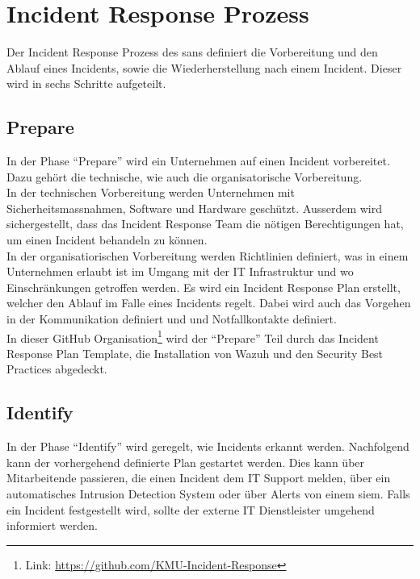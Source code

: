 \section{Incident Response Prozess}
Der Incident Response Prozess des \acrfull{sans} definiert die Vorbereitung und den Ablauf eines Incidents, sowie die Wiederherstellung nach einem Incident.
Dieser wird in sechs Schritte aufgeteilt. 

\subsection{Prepare}
In der Phase ``Prepare'' wird ein Unternehmen auf einen Incident vorbereitet. 
Dazu gehört die technische, wie auch die organisatorische Vorbereitung.\\

In der technischen Vorbereitung werden Unternehmen mit Sicherheitsmassnahmen, Software und Hardware geschützt.
Ausserdem wird sichergestellt, dass das Incident Response Team die nötigen Berechtigungen hat, um einen Incident behandeln zu können.\\

In der organisatiorischen Vorbereitung werden Richtlinien definiert, was in einem Unternehmen erlaubt ist im Umgang mit der IT Infrastruktur und wo Einschränkungen getroffen werden.
Es wird ein Incident Response Plan erstellt, welcher den Ablauf im Falle eines Incidents regelt.
Dabei wird auch das Vorgehen in der Kommunikation definiert und und Notfallkontakte definiert.\\

In dieser GitHub Organisation\footnote{Link: \href{https://github.com/KMU-Incident-Response}{https://github.com/KMU-Incident-Response}} wird der ``Prepare'' Teil durch das Incident Response Plan Template, die Installation von Wazuh und den Security Best Practices abgedeckt.

\subsection{Identify}
In der Phase ``Identify'' wird geregelt, wie Incidents erkannt werden. Nachfolgend kann der vorhergehend definierte Plan gestartet werden.
Dies kann über Mitarbeitende passieren, die einen Incident dem IT Support melden, über ein automatisches Intrusion Detection System oder über Alerts von einem \acrshort{siem}.
Falls ein Incident festgestellt wird, sollte der externe IT Dienstleister umgehend informiert werden.\\

